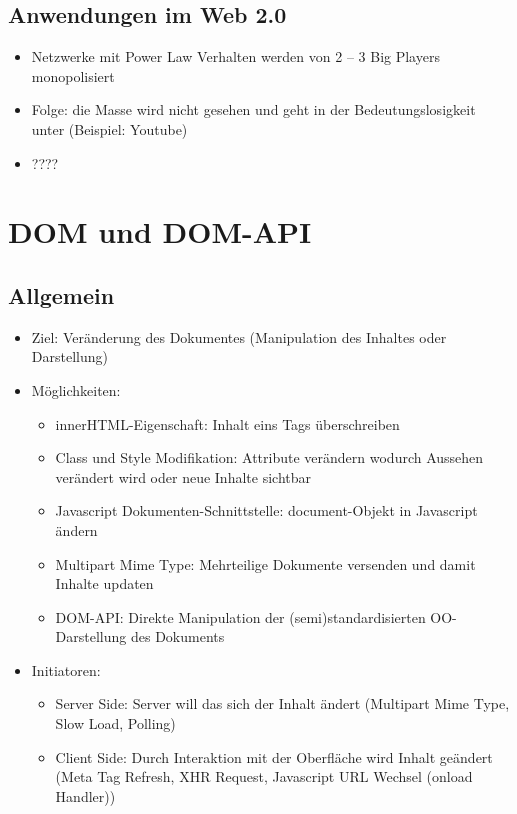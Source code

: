 \documentclass{article} %
\begin{document}
	\subsection{Anwendungen im Web 2.0}
	\begin{itemize}
		\item Netzwerke mit Power Law Verhalten werden von 2 – 3 Big Players monopolisiert
		\item Folge: die Masse wird nicht gesehen und geht in der Bedeutungslosigkeit unter (Beispiel: Youtube)
		\item ????
	\end{itemize}
	\section{DOM und DOM-API}
	\subsection{Allgemein}
	\begin{itemize}
		\item Ziel: Veränderung des Dokumentes (Manipulation des Inhaltes oder Darstellung)
		\item Möglichkeiten:
		\begin{itemize}
			\item innerHTML-Eigenschaft: Inhalt eins Tags überschreiben
			\item Class und Style Modifikation: Attribute verändern wodurch Aussehen verändert wird oder neue Inhalte sichtbar
			\item Javascript Dokumenten-Schnittstelle: document-Objekt in Javascript ändern
			\item Multipart Mime Type: Mehrteilige Dokumente versenden und damit Inhalte updaten
			\item DOM-API: Direkte Manipulation der (semi)standardisierten OO-Darstellung des Dokuments
		\end{itemize}
		\item Initiatoren:
		\begin{itemize}
			\item Server Side: Server will das sich der Inhalt ändert (Multipart Mime Type, Slow Load, Polling)
			\item Client Side: Durch Interaktion mit der Oberfläche wird Inhalt geändert (Meta Tag Refresh, XHR Request, Javascript URL Wechsel (onload Handler))
		\end{itemize}
	\end{itemize}
\end{document}
